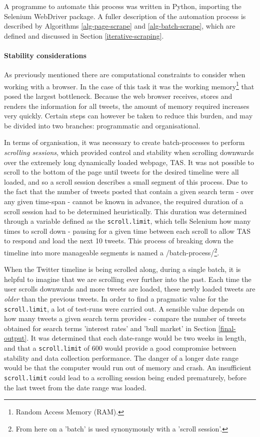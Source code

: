 \documentclass{article}
\begin{document}
A programme to automate this process was written in Python, importing the Selenium WebDriver package. A fuller description of the automation process is described by Algorithms \eqref{alg-page-scrape} and \eqref{alg-batch-scrape}, which are defined and discussed in Section \ref{iterative-scraping}.


\paragraph{Stability considerations}
\label{sec-1-3-2-1}

As previously mentioned there are computational constraints to consider when working with a browser. In the case of this task it was the working memory\footnote{Random Access Memory (RAM).} that posed the largest bottleneck. Because the web browser receives, stores and renders the information for all tweets, the amount of memory required increases very quickly. Certain steps can however be taken to reduce this burden, and may be divided into two branches: programmatic and organisational.

In terms of organisation, it was necessary to create batch-processes to perform \emph{scrolling sessions}, which provided control and stability when scrolling downwards over the extremely long dynamically loaded webpage, TAS. It was not possible to scroll to the bottom of the page until tweets for the desired timeline were all loaded, and so a scroll session describes a small segment of this process. Due to the fact that the number of tweets posted that contain a given search term - over any given time-span - cannot be known in advance, the required duration of a scroll session had to be determined heuristically. This duration was determined through a variable defined as the \texttt{scroll.limit}, which tells Selenium how many times to scroll down - pausing for a given time between each scroll to allow TAS to respond and load the next 10 tweets. This process of breaking down the timeline into more manageable segments is named a /batch-process/\footnote{From here on a 'batch' is used synonymously with a 'scroll session'.}.

When the Twitter timeline is being scrolled along, during a single batch, it is helpful to imagine that we are scrolling ever further into the past. Each time the user scrolls downwards and more tweets are loaded, these newly loaded tweets are \emph{older} than the previous tweets.
In order to find a pragmatic value for the \texttt{scroll.limit}, a lot of test-runs were carried out. A sensible value depends on how many tweets a given search term provides - compare the number of tweets obtained for search terms 'interest rates' and 'bull market' in Section \ref{final-output}. It was determined that each date-range would be two weeks in length, and that a \texttt{scroll.limit} of 600 would provide a good compromise between stability and data collection performance. The danger of a longer date range would be that the computer would run out of memory and crash. An insufficient \texttt{scroll.limit} could lead to a scrolling session being ended prematurely, before the last tweet from the date range was loaded.
\end{document}
